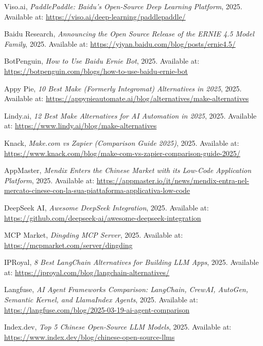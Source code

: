 \documentclass[11pt, a4paper, oneside]{article}
\begin{document}
\begin{thebibliography}{99}
    Viso.ai, \textit{PaddlePaddle: Baidu's Open-Source Deep Learning Platform}, 2025. Available at: \url{https://viso.ai/deep-learning/paddlepaddle/}

    Baidu Research, \textit{Announcing the Open Source Release of the ERNIE 4.5 Model Family}, 2025. Available at: \url{https://yiyan.baidu.com/blog/posts/ernie4.5/}

    BotPenguin, \textit{How to Use Baidu Ernie Bot}, 2025. Available at: \url{https://botpenguin.com/blogs/how-to-use-baidu-ernie-bot}

    Appy Pie, \textit{10 Best Make (Formerly Integromat) Alternatives in 2025}, 2025. Available at: \url{https://appypieautomate.ai/blog/alternatives/make-alternatives}

    Lindy.ai, \textit{12 Best Make Alternatives for AI Automation in 2025}, 2025. Available at: \url{https://www.lindy.ai/blog/make-alternatives}

    Knack, \textit{Make.com vs Zapier (Comparison Guide 2025)}, 2025. Available at: \url{https://www.knack.com/blog/make-com-vs-zapier-comparison-guide-2025/}

    AppMaster, \textit{Mendix Enters the Chinese Market with its Low-Code Application Platform}, 2025. Available at: \url{https://appmaster.io/it/news/mendix-entra-nel-mercato-cinese-con-la-sua-piattaforma-applicativa-low-code}

    DeepSeek AI, \textit{Awesome DeepSeek Integration}, 2025. Available at: \url{https://github.com/deepseek-ai/awesome-deepseek-integration}

    MCP Market, \textit{Dingding MCP Server}, 2025. Available at: \url{https://mcpmarket.com/server/dingding}

    IPRoyal, \textit{8 Best LangChain Alternatives for Building LLM Apps}, 2025. Available at: \url{https://iproyal.com/blog/langchain-alternatives/}

    Langfuse, \textit{AI Agent Frameworks Comparison: LangChain, CrewAI, AutoGen, Semantic Kernel, and LlamaIndex Agents}, 2025. Available at: \url{https://langfuse.com/blog/2025-03-19-ai-agent-comparison}

    Index.dev, \textit{Top 5 Chinese Open-Source LLM Models}, 2025. Available at: \url{https://www.index.dev/blog/chinese-open-source-llms}


\end{thebibliography}
\end{document}
